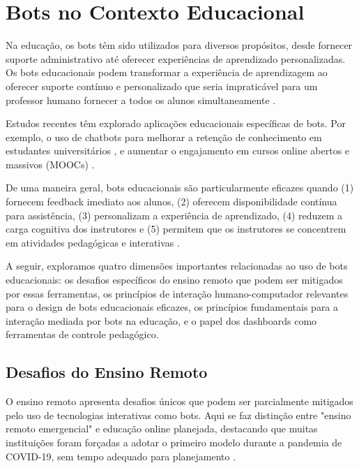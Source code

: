 \section{Bots no Contexto Educacional}
\label{sec:bots-educ}

Na educação, os bots têm sido utilizados para diversos propósitos, desde fornecer suporte administrativo até oferecer experiências de aprendizado personalizadas. Os bots educacionais podem transformar a experiência de aprendizagem ao oferecer suporte contínuo e personalizado que seria impraticável para um professor humano fornecer a todos os alunos simultaneamente \cite{zawacki2019}.

Estudos recentes têm explorado aplicações educacionais específicas de bots. Por exemplo, o uso de chatbots para melhorar a retenção de conhecimento em estudantes universitários \cite{okonkwo2021}, e aumentar o engajamento em cursos online abertos e massivos (MOOCs) \cite{han2022}.

De uma maneira geral, bots educacionais são particularmente eficazes quando (1) fornecem feedback imediato aos alunos, (2) oferecem disponibilidade contínua para assistência, (3) personalizam a experiência de aprendizado, (4) reduzem a carga cognitiva dos instrutores e (5) permitem que os instrutores se concentrem em atividades pedagógicas e interativas \cite{silva2024}.

A seguir, exploramos quatro dimensões importantes relacionadas ao uso de bots educacionais: os desafios específicos do ensino remoto que podem ser mitigados por essas ferramentas, os princípios de interação humano-computador relevantes para o design de bots educacionais eficazes, os princípios fundamentais para a interação mediada por bots na educação, e o papel dos dashboards como ferramentas de controle pedagógico.


\subsection{Desafios do Ensino Remoto}
\label{subsec:desafios}

O ensino remoto apresenta desafios únicos que podem ser parcialmente mitigados pelo uso de tecnologias interativas como bots. Aqui se faz distinção entre "ensino remoto emergencial" e educação online planejada, destacando que muitas instituições foram forçadas a adotar o primeiro modelo durante a pandemia de COVID-19, sem tempo adequado para planejamento \cite{hodges2020}\cite{fabiane2024}.


